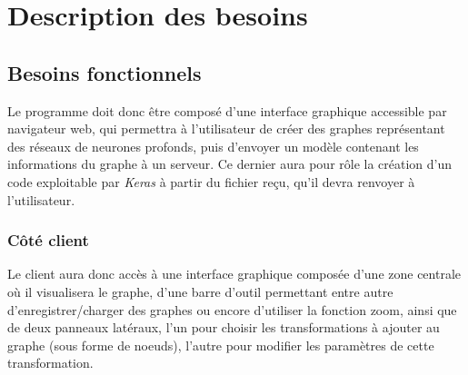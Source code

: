 \documentclass{article}
\begin{document}
\section{Description des besoins}
\subsection{Besoins fonctionnels}

Le programme doit donc être composé d'une interface graphique accessible par navigateur web, qui permettra à l'utilisateur de créer des graphes représentant des réseaux de neurones profonds, puis d'envoyer un modèle contenant les informations du graphe à un serveur. Ce dernier aura pour rôle la création d'un code exploitable par \textit{Keras} à partir du fichier reçu, qu'il devra renvoyer à l'utilisateur. \smallbreak

\subsubsection{Côté client}

Le client aura donc accès à une interface graphique composée d'une zone centrale où il visualisera le graphe, d'une barre d'outil permettant entre autre d'enregistrer/charger des graphes ou encore d'utiliser la fonction zoom, ainsi que de deux panneaux latéraux, l'un pour choisir les transformations à ajouter au graphe (sous forme de noeuds), l'autre pour modifier les paramètres de cette transformation. \\
\end{document}
